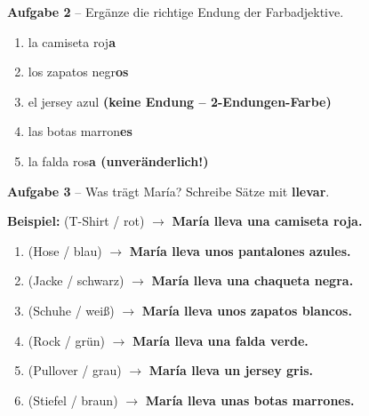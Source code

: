 \documentclass[11pt, a4paper]{article}
\newcommand{\fachfarbe}{spanisch}
\newcommand{\punktebox}[1]{\hfill\fbox{\small #1/#1}}
\newcommand{\lsg}[1]{\textcolor{loesung}{\textbf{#1}}}
\newcommand{\es}[1]{\textcolor{\fachfarbe}{\textbf{#1}}}
\begin{document}
\vspace{8pt}


\textbf{\textcolor{\fachfarbe}{Aufgabe 2}} -- Ergänze die richtige Endung der Farbadjektive. \punktebox{5}

\vspace{3pt}

\begin{enumerate}[label=\alph*), nosep, itemsep=4pt]
    \item la camiseta roj\lsg{a}
    \item los zapatos negr\lsg{os}
    \item el jersey azul \lsg{(keine Endung -- 2-Endungen-Farbe)}
    \item las botas marron\lsg{es}
    \item la falda ros\lsg{a (unveränderlich!)}
\end{enumerate}

\vspace{8pt}


\textbf{\textcolor{\fachfarbe}{Aufgabe 3}} -- Was trägt María? Schreibe Sätze mit \es{llevar}. \punktebox{6}

\vspace{3pt}

\begin{hinweis}
\small \textbf{Beispiel:} (T-Shirt / rot) $\rightarrow$ \es{María lleva una camiseta roja.}
\end{hinweis}

\vspace{3pt}

\begin{enumerate}[label=\alph*), nosep, itemsep=4pt]
    \item (Hose / blau) $\rightarrow$ \lsg{María lleva unos pantalones azules.}
    \item (Jacke / schwarz) $\rightarrow$ \lsg{María lleva una chaqueta negra.}
    \item (Schuhe / weiß) $\rightarrow$ \lsg{María lleva unos zapatos blancos.}
    \item (Rock / grün) $\rightarrow$ \lsg{María lleva una falda verde.}
    \item (Pullover / grau) $\rightarrow$ \lsg{María lleva un jersey gris.}
    \item (Stiefel / braun) $\rightarrow$ \lsg{María lleva unas botas marrones.}
\end{enumerate}
\end{document}
